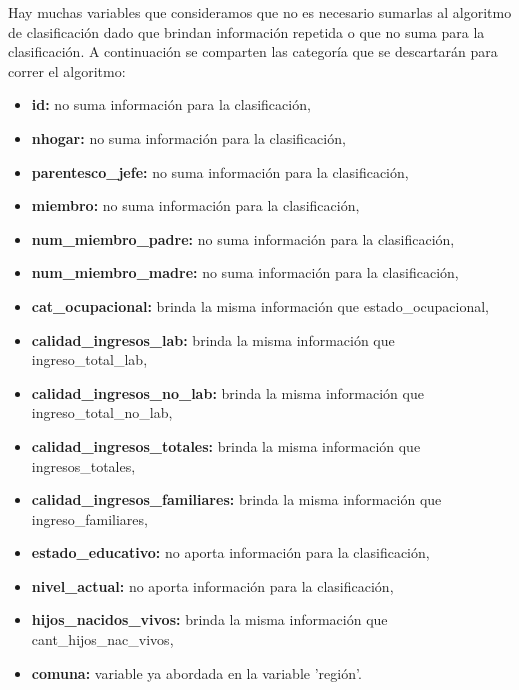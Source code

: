 \documentclass[a4paper]{article}
\begin{document}
        Hay muchas variables que consideramos que no es necesario sumarlas al algoritmo de clasificación dado que brindan información repetida o que no suma para la clasificación. A continuación se comparten las categoría que se descartarán para correr el algoritmo: 
        \begin{itemize}
            \item \textbf{id:} no suma información para la clasificación,
            \item \textbf{nhogar:} no suma información para la clasificación,
            \item \textbf{parentesco\_jefe:} no suma información para la clasificación,
            \item \textbf{miembro:} no suma información para la clasificación,
            \item \textbf{num\_miembro\_padre:} no suma información para la clasificación,
            \item \textbf{num\_miembro\_madre:} no suma información para la clasificación,
            \item \textbf{cat\_ocupacional:} brinda la misma información que estado\_ocupacional,
            \item \textbf{calidad\_ingresos\_lab:} brinda la misma información que ingreso\_total\_lab,
            \item \textbf{calidad\_ingresos\_no\_lab:} brinda la misma información que ingreso\_total\_no\_lab,
            \item \textbf{calidad\_ingresos\_totales:} brinda la misma información que ingresos\_totales,
            \item \textbf{calidad\_ingresos\_familiares:} brinda la misma información que ingreso\_familiares,
            \item \textbf{estado\_educativo:} no aporta información para la clasificación,
            \item \textbf{nivel\_actual:} no aporta información para la clasificación,
            \item \textbf{hijos\_nacidos\_vivos:} brinda la misma información que cant\_hijos\_nac\_vivos,
            \item \textbf{comuna:} variable ya abordada en la variable 'región'.
        \end{itemize}
\end{document}
